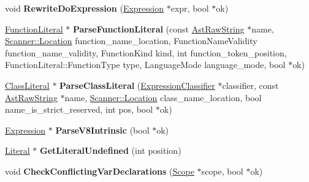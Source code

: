 \begin{DoxyCompactItemize}
\item 
void {\bfseries Rewrite\+Do\+Expression} (\hyperlink{classv8_1_1internal_1_1_expression}{Expression} $\ast$expr, bool $\ast$ok)\hypertarget{classv8_1_1internal_1_1_parser_ab077c165db05311290c254da1805d724}{}\label{classv8_1_1internal_1_1_parser_ab077c165db05311290c254da1805d724}

\item 
\hyperlink{classv8_1_1internal_1_1_function_literal}{Function\+Literal} $\ast$ {\bfseries Parse\+Function\+Literal} (const \hyperlink{classv8_1_1internal_1_1_ast_raw_string}{Ast\+Raw\+String} $\ast$name, \hyperlink{structv8_1_1internal_1_1_scanner_1_1_location}{Scanner\+::\+Location} function\+\_\+name\+\_\+location, Function\+Name\+Validity function\+\_\+name\+\_\+validity, Function\+Kind kind, int function\+\_\+token\+\_\+position, Function\+Literal\+::\+Function\+Type type, Language\+Mode language\+\_\+mode, bool $\ast$ok)\hypertarget{classv8_1_1internal_1_1_parser_a4ffdf28d47aa0372be974f21f99afee7}{}\label{classv8_1_1internal_1_1_parser_a4ffdf28d47aa0372be974f21f99afee7}

\item 
\hyperlink{classv8_1_1internal_1_1_class_literal}{Class\+Literal} $\ast$ {\bfseries Parse\+Class\+Literal} (\hyperlink{classv8_1_1internal_1_1_expression_classifier}{Expression\+Classifier} $\ast$classifier, const \hyperlink{classv8_1_1internal_1_1_ast_raw_string}{Ast\+Raw\+String} $\ast$name, \hyperlink{structv8_1_1internal_1_1_scanner_1_1_location}{Scanner\+::\+Location} class\+\_\+name\+\_\+location, bool name\+\_\+is\+\_\+strict\+\_\+reserved, int pos, bool $\ast$ok)\hypertarget{classv8_1_1internal_1_1_parser_a70d9f164641356db699b75ed360d12d8}{}\label{classv8_1_1internal_1_1_parser_a70d9f164641356db699b75ed360d12d8}

\item 
\hyperlink{classv8_1_1internal_1_1_expression}{Expression} $\ast$ {\bfseries Parse\+V8\+Intrinsic} (bool $\ast$ok)\hypertarget{classv8_1_1internal_1_1_parser_a38697354b586c935929bc4a6ddbe919e}{}\label{classv8_1_1internal_1_1_parser_a38697354b586c935929bc4a6ddbe919e}

\item 
\hyperlink{classv8_1_1internal_1_1_literal}{Literal} $\ast$ {\bfseries Get\+Literal\+Undefined} (int position)\hypertarget{classv8_1_1internal_1_1_parser_a7cd94931127111c17fc2ead92804399d}{}\label{classv8_1_1internal_1_1_parser_a7cd94931127111c17fc2ead92804399d}

\item 
void {\bfseries Check\+Conflicting\+Var\+Declarations} (\hyperlink{classv8_1_1internal_1_1_scope}{Scope} $\ast$scope, bool $\ast$ok)\hypertarget{classv8_1_1internal_1_1_parser_a2fe5981796aebb1eb2bba52188c5c06d}{}\label{classv8_1_1internal_1_1_parser_a2fe5981796aebb1eb2bba52188c5c06d}


\end{DoxyCompactItemize}
